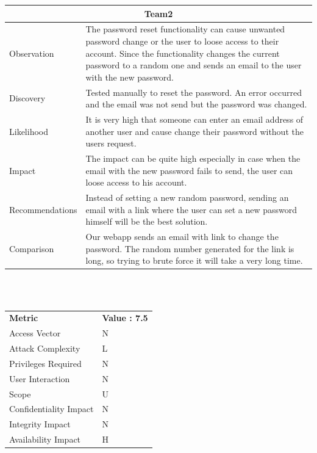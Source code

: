 \documentclass[headsepline,footsepline,footinclude=false,oneside,fontsize=11pt,paper=a4,listof=totoc,bibliography=totoc]{scrbook} %
\begin{document}
\begin{tabular}{ l|p{11cm}  }
	\hline
	\multicolumn{2}{c}{\textbf{Team2}} \\
	\hline
	Observation & The password reset functionality can cause unwanted password change or the user to loose access to their account. Since the functionality changes the current password to a random one and sends an email to the user with the new password. \\
	Discovery & Tested manually to reset the password. An error occurred and the email was not send but the password was changed.\\
	Likelihood & It is very high that someone can enter an email address of another user and cause change their password without the users request.\\
	Impact & The impact can be quite high especially in case when the email with the new password fails to send, the user can loose access to his account.\\
	Recommendations & Instead of setting a new random password, sending an email with a link where the user can set a new password himself will be the best solution.\\
	Comparison & Our webapp  sends an email with link to change the password. The random number generated for the link is long, so trying to brute force it will take a very long time.\\ 
	\hline
\end{tabular}
\\
\vspace{0.5cm}
\\
\begin{center}
	\begin{tabular}{ll}
		\rowcolor[HTML]{34CDF9}
		{\color[HTML]{ECF4FF} \textbf{Metric}}        & {\color[HTML]{ECF4FF} \textbf{Value : 7.5 }} \\
		\rowcolor[HTML]{BBDAFF}
		{\color[HTML]{333333} Access Vector}          & {\color[HTML]{333333} } N              \\
		\rowcolor[HTML]{ECF4FF}
		{\color[HTML]{333333} Attack Complexity}      & {\color[HTML]{333333} } L              \\
		\rowcolor[HTML]{BBDAFF}
		{\color[HTML]{333333} Privileges Required}    & {\color[HTML]{333333} } N              \\
		\rowcolor[HTML]{ECF4FF}
		{\color[HTML]{333333} User Interaction}       & {\color[HTML]{333333} } N              \\
		\rowcolor[HTML]{BBDAFF}
		{\color[HTML]{333333} Scope}                  & {\color[HTML]{333333} } U              \\
		\rowcolor[HTML]{ECF4FF}
		{\color[HTML]{333333} Confidentiality Impact} & {\color[HTML]{333333} } N              \\
		\rowcolor[HTML]{BBDAFF}
		{\color[HTML]{333333} Integrity Impact}       & {\color[HTML]{333333} } N              \\
		\rowcolor[HTML]{ECF4FF}
		{\color[HTML]{333333} Availability Impact}    & {\color[HTML]{333333} } H
	\end{tabular}
\end{center}
\end{document}
